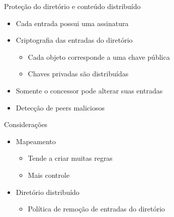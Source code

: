 \documentclass{beamer}
\begin{document}
  \begin{frame}{Proteção do diretório e conteúdo distribuído}
    \begin{itemize}
     \item Cada entrada possui uma assinatura
     \item Criptografia das entradas do diretório
     \begin{itemize}
      \item Cada objeto corresponde a uma chave pública
      \item Chaves privadas são distribuídas
     \end{itemize}
     \item Somente o concessor pode alterar suas entradas
     \item Detecção de peers maliciosos
    \end{itemize}
   
  \end{frame}
  
  \begin{frame}{Considerações}
   \begin{itemize}
    \item Mapeamento
    \begin{itemize}
     \item Tende a criar muitas regras
     \item Mais controle
    \end{itemize}
    \item Diretório distribuído
    \begin{itemize}
     \item Política de remoção de entradas do diretório
    \end{itemize}
   \end{itemize}
  \end{frame}
\end{document}
